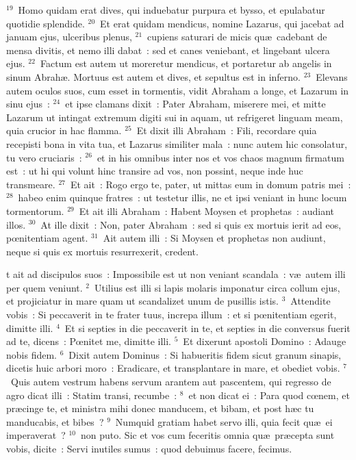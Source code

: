 ${}^{19}$~Homo quidam erat dives, qui induebatur purpura et bysso, et epulabatur quotidie splendide.
${}^{20}$~Et erat quidam mendicus, nomine Lazarus, qui jacebat ad januam ejus, ulceribus plenus,
${}^{21}$~cupiens saturari de micis qu\ae\ cadebant de mensa divitis, et nemo illi dabat~: sed et canes veniebant, et lingebant ulcera ejus.
${}^{22}$~Factum est autem ut moreretur mendicus, et portaretur ab angelis in sinum Abrah\ae . Mortuus est autem et dives, et sepultus est in inferno.
${}^{23}$~Elevans autem oculos suos, cum esset in tormentis, vidit Abraham a longe, et Lazarum in sinu ejus~:
${}^{24}$~et ipse clamans dixit~: Pater Abraham, miserere mei, et mitte Lazarum ut intingat extremum digiti sui in aquam, ut refrigeret linguam meam, quia crucior in hac flamma.
${}^{25}$~Et dixit illi Abraham~: Fili, recordare quia recepisti bona in vita tua, et Lazarus similiter mala~: nunc autem hic consolatur, tu vero cruciaris~:
${}^{26}$~et in his omnibus inter nos et vos chaos magnum firmatum est~: ut hi qui volunt hinc transire ad vos, non possint, neque inde huc transmeare.
${}^{27}$~Et ait~: Rogo ergo te, pater, ut mittas eum in domum patris mei~:
${}^{28}$~habeo enim quinque fratres~: ut testetur illis, ne et ipsi veniant in hunc locum tormentorum.
${}^{29}$~Et ait illi Abraham~: Habent Moysen et prophetas~: audiant illos.
${}^{30}$~At ille dixit~: Non, pater Abraham~: sed si quis ex mortuis ierit ad eos, pœnitentiam agent.
${}^{31}$~Ait autem illi~: Si Moysen et prophetas non audiunt, neque si quis ex mortuis resurrexerit, credent.

\bchapter
{}t ait ad discipulos suos~: Impossibile est ut non veniant scandala~: v\ae\ autem illi per quem veniunt.
${}^{2}$~Utilius est illi si lapis molaris imponatur circa collum ejus, et projiciatur in mare quam ut scandalizet unum de pusillis istis.
${}^{3}$~Attendite vobis~: Si peccaverit in te frater tuus, increpa illum~: et si pœnitentiam egerit, dimitte illi.
${}^{4}$~Et si septies in die peccaverit in te, et septies in die conversus fuerit ad te, dicens~: Pœnitet me, dimitte illi.
${}^{5}$~Et dixerunt apostoli Domino~: Adauge nobis fidem.
${}^{6}$~Dixit autem Dominus~: Si habueritis fidem sicut granum sinapis, dicetis huic arbori moro~: Eradicare, et transplantare in mare, et obediet vobis.
${}^{7}$~Quis autem vestrum habens servum arantem aut pascentem, qui regresso de agro dicat illi~: Statim transi, recumbe~:
${}^{8}$~et non dicat ei~: Para quod cœnem, et pr\ae cinge te, et ministra mihi donec manducem, et bibam, et post h\ae c tu manducabis, et bibes~?
${}^{9}$~Numquid gratiam habet servo illi, quia fecit qu\ae\ ei imperaverat~?
${}^{10}$~non puto. Sic et vos cum feceritis omnia qu\ae\ pr\ae cepta sunt vobis, dicite~: Servi inutiles sumus~: quod debuimus facere, fecimus.


